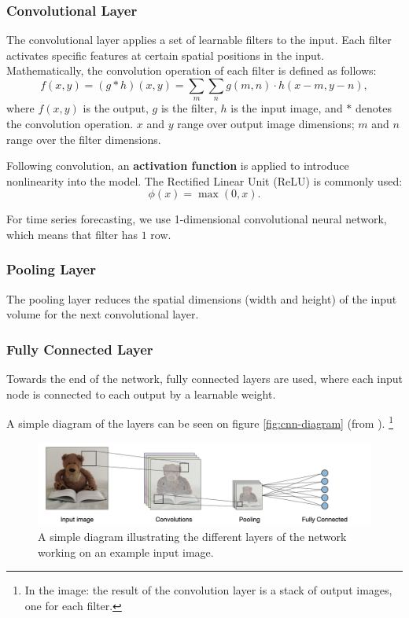 \subsubsection{Convolutional Layer}
The convolutional layer applies a set of learnable filters to the input. Each filter activates specific features at certain spatial positions in the input. Mathematically, the convolution operation of each filter is defined as follows:
\[f(x, y) = (g * h)(x, y) = \sum_m\sum_n g(m,n) \cdot h(x-m, y-n),\]
where \(f(x, y)\) is the output, \(g\) is the filter, \(h\) is the input image, and \(*\) denotes the convolution operation. \(x\) and \(y\) range over output image dimensions; \(m\) and \(n\) range over the filter dimensions.

Following convolution, an \textbf{activation function} is applied to introduce nonlinearity into the model. The Rectified Linear Unit (ReLU) \label{relu} is commonly used:
\[\phi(x) = \max(0, x).\]

For time series forecasting, we use 1-dimensional convolutional neural network, which means that filter has \(1\) row.


\subsubsection{Pooling Layer}
The pooling layer reduces the spatial dimensions (width and height) of the input volume for the next convolutional layer.

\subsubsection{Fully Connected Layer}
Towards the end of the network, fully connected layers are used, where each input node is connected to each output by a learnable weight.

A simple diagram of the layers can be seen on figure \autoref{fig:cnn-diagram} (from \cite{cnn_diagram_source}). \footnote{In the image: the result of the convolution layer is a stack of output images, one for each filter.}

\begin{figure}[h!]
	\centering
	\includegraphics[width=0.5\linewidth]{"pictures/architecture-cnn-en.jpeg"}
	\caption{A simple diagram illustrating the different layers of the network working on an example input image.}
	\label{fig:cnn-diagram}

\end{figure}

